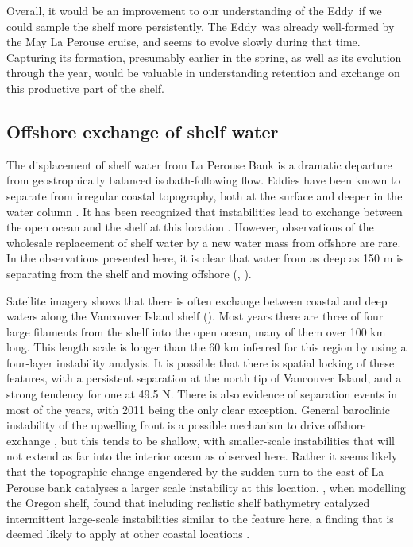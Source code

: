 \documentclass[draft]{agujournal2019}
\newcommand*{\Eddy}{{\sc Eddy}}
\begin{document}
Overall, it would be an improvement to our understanding of the \Eddy\ if we could sample the shelf more persistently.  The \Eddy\ was already well-formed by the May La Perouse cruise, and seems to evolve slowly during that time.  Capturing its formation, presumably earlier in the spring, as well as its evolution through the year, would be valuable in understanding retention and exchange on this productive part of the shelf.

\subsection{Offshore exchange of shelf water}

The displacement of shelf water from La Perouse Bank is a dramatic departure from geostrophically balanced isobath-following flow.  Eddies have been known to separate from irregular coastal topography, both at the surface \cite{barthetal00} and deeper in the water column \cite{pellandetal13}.   It has been recognized that instabilities lead to exchange between the open ocean and the shelf at this location \cite{ikedaemery84, ikedaemery84}.   However, observations of the wholesale replacement of shelf water by a new water mass from offshore are rare. In the  observations presented here, it is clear that water from as deep as 150 m is separating from the shelf and moving offshore (, ).

Satellite imagery shows that there is often exchange between coastal and deep waters along the Vancouver Island shelf ().  Most years there are three of four large filaments from the shelf into the open ocean, many of them over 100 km long.  This length scale is longer than the 60 km inferred for this region by  using a four-layer instability analysis.  It is possible that there is spatial locking of these features, with a persistent separation at the north tip of Vancouver Island, and a strong tendency for one at 49.5 N. There is also evidence of separation events in most of the years, with 2011 being the only clear exception. General baroclinic instability of the upwelling front is a possible mechanism to drive offshore exchange \cite{ikedaetal84,durskiallen05}, but this tends to be shallow, with smaller-scale instabilities that will not extend as far into the interior ocean as observed here.  Rather it seems likely that the topographic change engendered by the sudden turn to the east of La Perouse bank catalyses a larger scale instability at this location.  , when modelling the Oregon shelf, found that including realistic shelf bathymetry catalyzed intermittent large-scale instabilities similar to the feature here, a finding that is deemed likely to apply at other coastal locations \cite{batteen97}.
\end{document}
